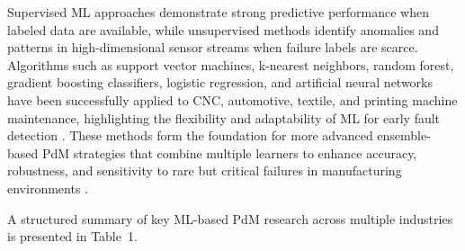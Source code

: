 \documentclass[final,5p, twocolumn]{elsarticle}
\begin{document}
Supervised ML approaches demonstrate strong predictive performance when labeled data are available, while unsupervised methods identify anomalies and patterns in high-dimensional sensor streams when failure labels are scarce. Algorithms such as support vector machines, k-nearest neighbors, random forest, gradient boosting classifiers, logistic regression, and artificial neural networks have been successfully applied to CNC, automotive, textile, and printing machine maintenance, highlighting the flexibility and adaptability of ML for early fault detection \cite{amihai2018industrial,ouadah2022selecting}. These methods form the foundation for more advanced ensemble-based PdM strategies that combine multiple learners to enhance accuracy, robustness, and sensitivity to rare but critical failures in manufacturing environments \cite{mathew2017regression,Ahmad2019-fa,manfre2020creation}.

A structured summary of key ML-based PdM research across multiple industries is presented in Table~1.


\end{document}
